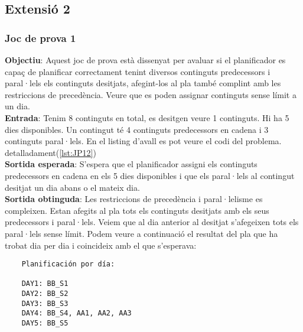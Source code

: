 \documentclass[a4paper]{article}
\begin{document}
	
	
	\subsection{Extensió 2}
	
	\subsubsection{Joc de prova 1}
	\textbf{Objectiu}: Aquest joc de prova està dissenyat per avaluar si el planificador es capaç de planificar correctament tenint diversos continguts predecessors i paral·lels els continguts desitjats, afegint-los al pla també complint amb les restriccions de precedència. Veure que es poden assignar continguts sense límit a un dia. \\
	\textbf{Entrada}: Tenim 8 continguts en total, es desitgen veure 1 continguts. Hi ha 5 dies disponibles. Un contingut té 4 continguts predecessors en cadena i 3 continguts paral·lels. En el listing d'avall es pot veure el codi del problema.  detalladament(\ref{lst:JP12})\\
	\textbf{Sortida esperada}: S'espera que el planificador assigni els continguts predecessors en cadena en els 5 dies disponibles i que els paral·lels al contingut desitjat un dia abans o el mateix dia. \\
	\textbf{Sortida obtinguda}:  Les restriccions de  precedència i paral·lelisme es compleixen.  Estan afegits al pla tots els continguts desitjats amb els seus predecessors i paral·lels. Veiem que al dia anterior al desitjat s'afegeixen tots els paral·lels sense límit. Podem veure a continuació el resultat del pla que ha trobat dia per dia i coincideix amb el que s'esperava:
	
	\begin{verbatim}
	Planificación por día:
	
	DAY1: BB_S1
	DAY2: BB_S2
	DAY3: BB_S3
	DAY4: BB_S4, AA1, AA2, AA3
	DAY5: BB_S5
		
	\end{verbatim}
	
\end{document}
